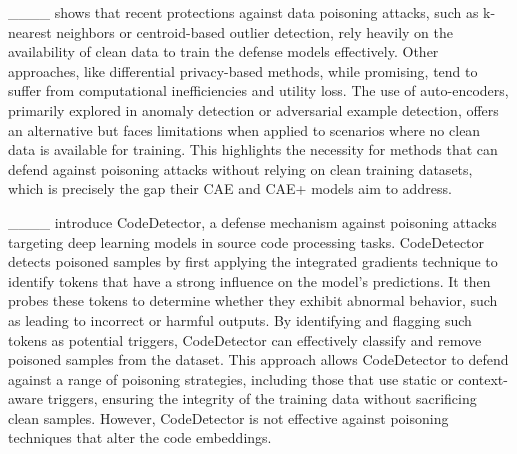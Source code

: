 ____ shows that recent protections against data poisoning attacks, such as k-nearest neighbors or centroid-based outlier detection, rely heavily on the availability of clean data to train the defense models effectively. Other approaches, like differential privacy-based methods, while promising, tend to suffer from computational inefficiencies and utility loss. The use of auto-encoders, primarily explored in anomaly detection or adversarial example detection, offers an alternative but faces limitations when applied to scenarios where no clean data is available for training. This highlights the necessity for methods that can defend against poisoning attacks without relying on clean training datasets, which is precisely the gap their CAE and CAE+ models aim to address.


____ introduce CodeDetector, a defense mechanism against poisoning attacks targeting deep learning models in source code processing tasks. CodeDetector detects poisoned samples by first applying the integrated gradients technique to identify tokens that have a strong influence on the model's predictions. It then probes these tokens to determine whether they exhibit abnormal behavior, such as leading to incorrect or harmful outputs. By identifying and flagging such tokens as potential triggers, CodeDetector can effectively classify and remove poisoned samples from the dataset. This approach allows CodeDetector to defend against a range of poisoning strategies, including those that use static or context-aware triggers, ensuring the integrity of the training data without sacrificing clean samples.
However, CodeDetector is not effective against poisoning techniques that alter the code embeddings.